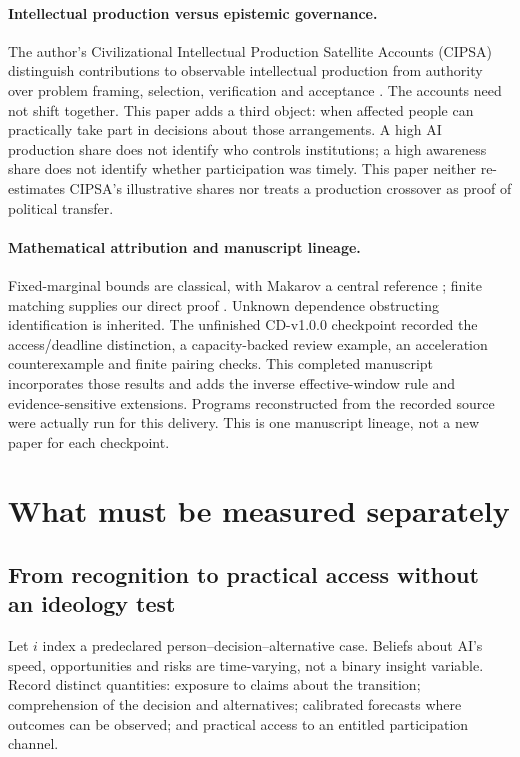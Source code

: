 \documentclass[11pt,a4paper]{article}
\theoremstyle{definition}\newtheorem{definition}{Definition}
\begin{document}
\paragraph{Intellectual production versus epistemic governance.}
The author's Civilizational Intellectual Production Satellite Accounts (CIPSA) distinguish contributions to observable intellectual production from authority over problem framing, selection, verification and acceptance \cite{cipsa}. The accounts need not shift together. This paper adds a third object: when affected people can practically take part in decisions about those arrangements. A high AI production share does not identify who controls institutions; a high awareness share does not identify whether participation was timely. This paper neither re-estimates CIPSA's illustrative shares nor treats a production crossover as proof of political transfer.

\paragraph{Mathematical attribution and manuscript lineage.}
Fixed-marginal bounds are classical, with Makarov a central reference \cite{makarov}; finite matching supplies our direct proof \cite{hall}. Unknown dependence obstructing identification is inherited. The unfinished CD-v1.0.0 checkpoint recorded the access/deadline distinction, a capacity-backed review example, an acceleration counterexample and finite pairing checks. This completed manuscript incorporates those results and adds the inverse effective-window rule and evidence-sensitive extensions. Programs reconstructed from the recorded source were actually run for this delivery. This is one manuscript lineage, not a new paper for each checkpoint.

\section{What must be measured separately}
\label{sec:objects}
\subsection{From recognition to practical access without an ideology test}
Let $i$ index a predeclared person--decision--alternative case. Beliefs about AI's speed, opportunities and risks are time-varying, not a binary insight variable. Record distinct quantities: exposure to claims about the transition; comprehension of the decision and alternatives; calibrated forecasts where outcomes can be observed; and practical access to an entitled participation channel.
\end{document}
